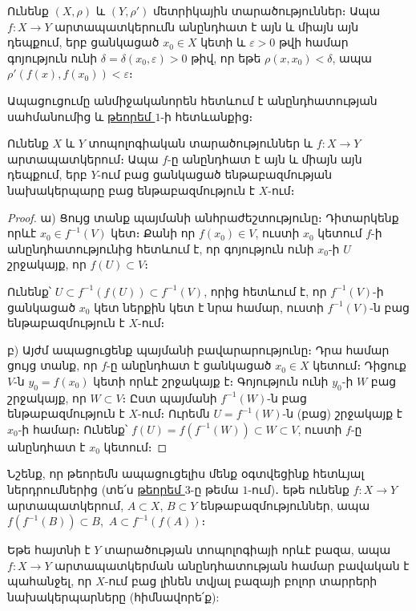 \documentclass[./main.tex]{subfiles}
\begin{document}
\begin{theorem}\label{ch9thm2} 
\label{թեորեմ $2$}
Ունենք $(X, \rho)$ և $(Y, \rho')$ մետրիկային տարածություններ։ Ապա \linebreak ${f:X  \rightarrow  Y}$ արտապատկերումն անընդհատ է այն և միայն այն դեպքում, երբ ցան\-կացած $x_0\in X$ կետի և $\varepsilon >0$ թվի համար գոյություն ունի $\delta=\delta(x_0, \varepsilon)>0$ թիվ, որ եթե $\rho(x,x_0)<\delta$, ապա ${\rho'} (f(x),f(x_0 ))< \varepsilon$։
\end{theorem}
Ապացուցումը անմիջականորեն հետևում է անընդհատության սահմանումից և \hyperref[ch9thm1]{թեորեմ $1$}-ի հետևանքից։
\begin{theorem}\label{ch9thm3}\label{թեորեմ $3$}
Ունենք $X$ և $Y$ տոպոլոգիական տարածություններ և ${f:X  \rightarrow  Y}$ արտապատկերում։ Ապա $f$-ը անընդհատ է այն և միայն այն դեպքում, երբ $Y\textrm{-ում}$ բաց ցանկացած ենթաբազմության նախակերպարը բաց ենթաբազմություն է $X\textrm{-ում}$։
\end{theorem}
\begin{proof}
\par ա) Ցույց տանք պայմանի անհրաժեշտությունը։ Դիտարկենք որևէ $x_0\in f^{-1} (V)$ կետ։ Քանի որ $f(x_0 )\in V$, ուստի $x_0$ կետում $f$-ի անընդ\-հա\-տութ\-յունից հետևում է, որ գոյություն ունի $x_0$-ի $U$ շրջակայք, որ $f(U)\subset V$։
\par Ունենք՝ $U\subset f^{-1}(f(U))\subset f^{-1} (V)$, որից հետևում է, որ $f^{-1} (V)$-ի ցանկացած $x_0$ կետ ներքին կետ է նրա համար, ուստի $f^{-1} (V)$-ն բաց ենթաբազմություն է $X$-ում։
\par բ) Այժմ ապացուցենք պայմանի բավարարությունը։ Դրա համար ցույց տանք, որ $f$-ը անընդհատ է ցանկացած $x_0\in X$ կետում։ Դիցուք $V$-ն $y_0=f(x_0)$ կետի որևէ շրջակայք է։ Գոյություն ունի $y_0$-ի $W$ բաց շրջակայք, որ $W\subset V$։ Ըստ պայմանի $f^{-1}(W)$-ն բաց ենթաբազմություն է $X$-ում։ Ուրեմն $U=f^{-1}(W)$-ն (բաց) շրջակայք է $x_0$-ի համար։ Ունենք՝ $f(U)=f(f^{-1}(W))\subset W\subset V$, ուստի $f$-ը անընդհատ է $x_0$ կետում։\qedhere
\end{proof}

\par Նշենք, որ թեորեմն ապացուցելիս մենք օգտվեցինք հետևյալ ներդրումներից (տե՛ս \hyperref[ch1thm3]{թեորեմ $3$}-ը թեմա $1$-ում)․ եթե ունենք $f:X  \rightarrow  Y$ արտապատկերում, $A\subset X$, $B\subset Y$ ենթաբազմություններ, ապա $f(f^{-1}(B))\subset B$,\, $A\subset f^{-1} (f(A))$։


\begin{hetevanq_counter}\label{ch9cor2}
Եթե հայտնի է $Y$ տարածության տոպոլոգիայի որևէ բազա, ապա ${f: X \to Y}$ արտապատկերման անընդհատության համար բավական է պահանջել, որ $X$-ում բաց լինեն տվյալ բազայի բոլոր տարրերի նախակերպարները (հիմնավո\-րե՛ք):
\end{hetevanq_counter}
\end{document}
